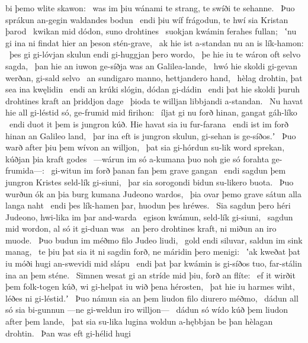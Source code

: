 bi þemo wlite skawon: \hld\ was im þiu wánami te strang, %
te swíði te sehanne. \hld\ Þuo sprákun  an-gegin
waldandes bodun \hld\ endi þiu wíf frágodun,
te hwí sia Kristan þarod \hld\ kwikan mid dódon,
suno drohtines \hld\ suokjan kwámin
ferahes fullan; \hld\ ʽnu gi ina ni findat hier
an þeson stén-grave, \hld\ ak hie ist a-standan nu
an is lík-hamon: \hld\ þes gi gi-lóvjan skulun
endi gi-huggjan þero wordo, \hld\ þe hie iu te wáron oft
selvo sagda, \hld\ þan hie an iuwon ge-síðja was
an Galilea-lande, \hld\ hwó hie skoldi gi-gevan werðan,
gi-sald selvo \hld\ an sundigaro manno,
hettjandero hand, \hld\ hèlag drohtin,
þat sea ina kwęlidin \hld\ endi an krúki slógin,
dódan gi-dádin \hld\ endi þat hie skoldi þuruh drohtines kraft
an þriddjon dage \hld\ þioda te willjan
libbjandi a-standan. \hld\ Nu havat hie all gi-léstid só,
ge-frumid mid firihon: \hld\ íljat gi nu forð hinan,
gangat gáh-líko \hld\ endi duot it þem is jungron kúð.
Hie havat sia iu fur-farana \hld\ endi ist im forð hinan
an Galileo land, \hld\ þar ina eft is jungron skulun,
gi-sehan is ge-síðos.ʼ \hld\ Þuo warð  after þiu
þem wívon an willjon, \hld\ þat sia gi-hórdun su-lik word sprekan,
kúðjan þia kraft godes \hld\ —wárun im só a-kumana þuo noh
gie só forahta ge-frumida—: \hld\ gi-witun im forð þanan %
fan þem grave gangan \hld\ endi sagdun þem jungron Kristes
seld-lík gi-siuni, \hld\ þar sia sorogondi
bidun su-likero buota. \hld\ Þuo wurðun ók an þia burg kumana
Judeono wardos, \hld\ þia ovar þemo grave sátun
alla langa naht \hld\ endi þes lík-hamen þar,
huodun þes hréwes. \hld\ Sia sagdun þero héri Judeono,
hwi-lika im þar and-warda \hld\ egison kwámun,
seld-lík gi-siuni, \hld\ sagdun mid wordon,
al só it gi-duan was \hld\ an þero drohtines kraft,
ni miðun an iro muode. \hld\ Þuo budun im méðmo filo
Judeo liudi, \hld\ gold endi siluvar,
saldun im sink manag, \hld\ te þiu þat sia it ni sagdin forð,
ne máridin þero menigi: \hld\ ʽak kweðat þat iu móði hugi
an-swevidi mid slápu \hld\ endi þat þar kwámin is gi-síðos tuo,
far-stálin ina an þem sténe. \hld\ Simnen wesat gi an stríde mid þiu,
forð an flíte: \hld\ ef it wirðit þem folk-togen kúð,
wi gi-helpat iu wið þena hérosten, \hld\ þat hie iu harmes wiht,
léðes ni gi-léstid.ʼ \hld\ Þuo námun sia an þem liudon filo
diurero méðmo, \hld\ dádun all só sia bi-gunnun
—ne gi-weldun iro willjon— \hld\ dádun só wído kúð
þem liudon after þem lande, \hld\ þat sia su-lika lugina woldun
a-hębbjan be þan hèlagan drohtin. \hld\ Þan was eft gi-hélid hugi
